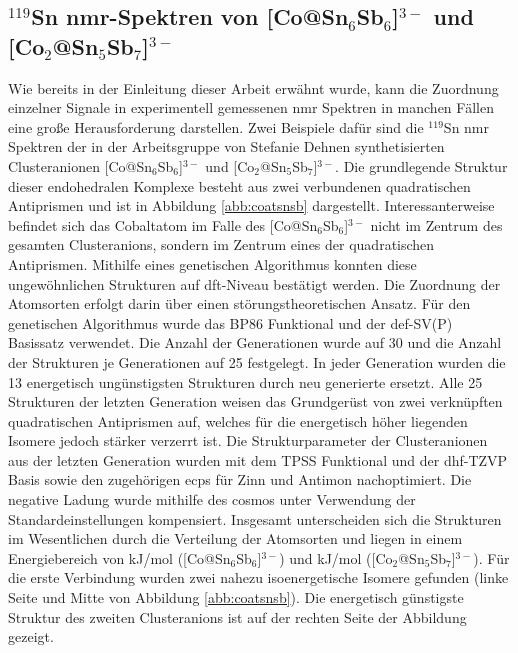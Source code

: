\subsection{\texorpdfstring{$^{119}$Sn \acs{nmr}-Spektren von [Co@Sn$_6$Sb$_6$]$^{3-}$ und [Co$_2$@Sn$_5$Sb$_7$]$^{3-}$}{119Sn NMR Spektren von [Co at Sn\_6Sb\_6]3- und [Co\_2 at Sn\_5Sb\_7]3-}}
Wie bereits in der Einleitung dieser Arbeit erwähnt wurde, kann die Zuordnung einzelner Signale in experimentell gemessenen \ac{nmr} Spektren in manchen Fällen eine große Herausforderung darstellen. Zwei Beispiele dafür sind die $^{119}$Sn \ac{nmr} Spektren der in der Arbeitsgruppe von Stefanie Dehnen synthetisierten Clusteranionen [Co@Sn$_6$Sb$_6$]$^{3-}$ und [Co$_2$@Sn$_5$Sb$_7$]$^{3-}$.\supercite{wilson2018structure} Die grundlegende Struktur dieser endohedralen Komplexe besteht aus zwei verbundenen quadratischen Antiprismen und ist in Abbildung \ref{abb:coatsnsb} dargestellt. Interessanterweise befindet sich das Cobaltatom im Falle des [Co@Sn$_6$Sb$_6$]$^{3-}$ nicht im Zentrum des gesamten Clusteranions, sondern im Zentrum eines der quadratischen Antiprismen. Mithilfe eines genetischen Algorithmus\supercite{weigend2014extending} konnten diese ungewöhnlichen Strukturen auf \ac{dft}-Niveau bestätigt werden. Die Zuordnung der Atomsorten erfolgt darin über einen störungstheoretischen Ansatz. Für den genetischen Algorithmus wurde das BP86 Funktional\supercite{perdew1986density,becke1988density} und der def-SV(P) Basissatz\supercite{eichkorn1997auxiliary} verwendet. Die Anzahl der Generationen wurde auf 30 und die Anzahl der Strukturen je Generationen auf 25 festgelegt. In jeder Generation wurden die 13 energetisch ungünstigsten Strukturen durch neu generierte ersetzt. Alle 25 Strukturen der letzten Generation weisen das Grundgerüst von zwei verknüpften quadratischen Antiprismen auf, welches für die energetisch höher liegenden Isomere jedoch stärker verzerrt ist. Die Strukturparameter der Clusteranionen aus der letzten Generation wurden  mit dem TPSS Funktional\supercite{tao2003climbing} und der dhf-TZVP Basis\supercite{weigend2010segmented} sowie den zugehörigen \acp{ecp}\supercite{metz2000small} für Zinn und Antimon nachoptimiert. Die negative Ladung wurde mithilfe des \acp{cosmo}\supercite{klamt1993cosmo} unter Verwendung der Standardeinstellungen kompensiert. Insgesamt unterscheiden sich die Strukturen im Wesentlichen durch die Verteilung der Atomsorten und liegen in einem Energiebereich von \unit[37]{kJ/mol} ([Co@Sn$_6$Sb$_6$]$^{3-}$) und \unit[22]{kJ/mol} ([Co$_2$@Sn$_5$Sb$_7$]$^{3-}$). Für die erste Verbindung wurden zwei nahezu isoenergetische Isomere gefunden (linke Seite und Mitte von Abbildung \ref{abb:coatsnsb}). Die energetisch günstigste Struktur des zweiten Clusteranions ist auf der rechten Seite der Abbildung gezeigt.

